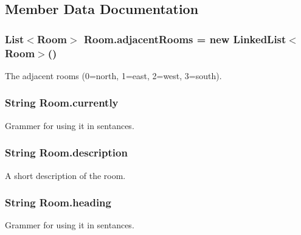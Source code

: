 \subsection{Member Data Documentation}
\hypertarget{classRoom_a9d060d005fd9719f87f5045656fdf7f0}{}
\subsubsection[{adjacent\+Rooms}]{\setlength{\rightskip}{0pt plus 5cm}List$<${\bf Room}$>$ Room.\+adjacent\+Rooms = new Linked\+List$<${\bf Room}$>$()\hspace{0.3cm}{\ttfamily [protected]}}\label{classRoom_a9d060d005fd9719f87f5045656fdf7f0}
The adjacent rooms (0=north, 1=east, 2=west, 3=south). \hypertarget{classRoom_a2f0c64fd0d90618f9c36b935a6f6bb49}{}
\subsubsection[{currently}]{\setlength{\rightskip}{0pt plus 5cm}String Room.\+currently\hspace{0.3cm}{\ttfamily [protected]}}\label{classRoom_a2f0c64fd0d90618f9c36b935a6f6bb49}
Grammer for using it in sentances. \hypertarget{classRoom_a2d7ecf802690a6b13750ca6fa6882d77}{}
\subsubsection[{description}]{\setlength{\rightskip}{0pt plus 5cm}String Room.\+description\hspace{0.3cm}{\ttfamily [protected]}}\label{classRoom_a2d7ecf802690a6b13750ca6fa6882d77}
A short description of the room. \hypertarget{classRoom_ad9e86528519166f3ac3b1413da4e0a41}{}
\subsubsection[{heading}]{\setlength{\rightskip}{0pt plus 5cm}String Room.\+heading\hspace{0.3cm}{\ttfamily [protected]}}\label{classRoom_ad9e86528519166f3ac3b1413da4e0a41}
Grammer for using it in sentances. \hypertarget{classRoom_a9ae4a56ee28e7e6cae000555032a8e41}{}
